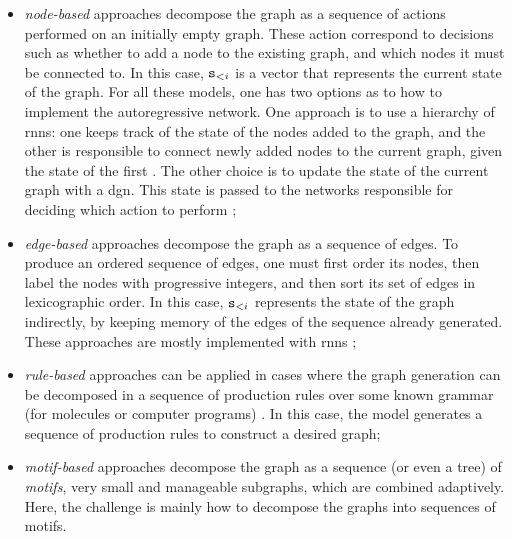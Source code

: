\begin{itemize}
    \item \emph{node-based} approaches decompose the graph as a sequence of actions performed on an initially empty graph. These action correspond to decisions such as whether to add a node to the existing graph, and which nodes it must be connected to. In this case, $\mathtt{s}_{<i}$ is a vector that represents the current state of the graph. For all these models, one has two options as to how to implement the autoregressive network. One approach is to use a hierarchy of \glspl{rnn}: one keeps track of the state of the nodes added to the graph, and the other is responsible to connect newly added nodes to the current graph, given the state of the first \citep{you2018graphrnn}. The other choice is to update the state of the current graph with a \gls{dgn}. This state is passed to the networks responsible for deciding which action to perform \citep{li2018learningdeepgmg};
    \item \emph{edge-based} approaches decompose the graph as a sequence of edges. To produce an ordered sequence of edges, one must first order its nodes, then label the nodes with progressive integers, and then sort its set of edges in lexicographic order. In this case, $\mathtt{s}_{<i}$ represents the state of the graph indirectly, by keeping memory of the edges of the sequence already generated. These approaches are mostly implemented with \glspl{rnn} \citep{goyal2020graphgen,bacciu2019edgegraphgenrnn};
    \item \emph{rule-based} approaches can be applied in cases where the graph generation can be decomposed in a sequence of production rules over some known grammar (\eg for molecules or computer programs) \citep{kusner2017grammarvae,dai2018sdvae}. In this case, the model generates a sequence of production rules to construct a desired graph;
    \item \emph{motif-based} approaches decompose the graph as a sequence (or even a tree) of \emph{motifs}, \ie very small and manageable subgraphs, which are combined adaptively. Here, the challenge is mainly how to decompose the graphs into sequences of motifs.
\end{itemize}
